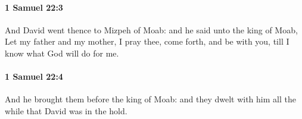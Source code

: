 		\paragraph{1 Samuel 22:3} %
			\label{1SAMUEL-22-3}

			And David went thence to Mizpeh of Moab: and he said unto the king of Moab, Let my father and my mother, I pray thee, come forth, and be with you, till I know what God will do for me.


		\paragraph{1 Samuel 22:4} %
			\label{1SAMUEL-22-4}

			And he brought them before the king of Moab: and they dwelt with him all the while that David was in the hold.


